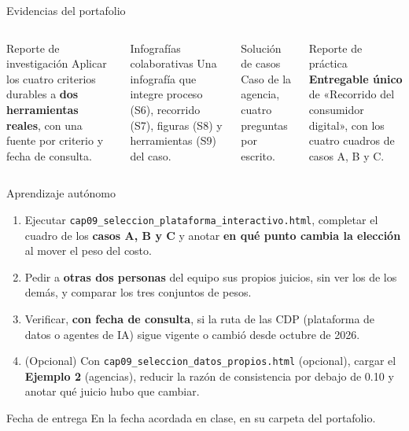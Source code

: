 \documentclass[aspectratio=169,xcolor=dvipsnames]{beamer}
\begin{document}
\begin{frame}{Evidencias del portafolio}
\small
\begin{columns}[T]
  \begin{block}{Reporte de investigación}
    \scriptsize Aplicar los cuatro criterios durables a \textbf{dos herramientas reales}, con una fuente por criterio y fecha de consulta.
  \end{block}
  \begin{block}{Infografías colaborativas}
    \scriptsize Una infografía que integre proceso (S6), recorrido (S7), figuras (S8) y herramientas (S9) del caso.
  \end{block}
  \begin{block}{Solución de casos}
    \scriptsize Caso de la agencia, cuatro preguntas por escrito.
  \end{block}
  \begin{block}{Reporte de práctica}
    \scriptsize \textbf{Entregable único} de «Recorrido del consumidor digital», con los cuatro cuadros de casos A, B y C.
  \end{block}
\end{columns}
\end{frame}

\begin{frame}{Aprendizaje autónomo}
\footnotesize
\begin{enumerate}
  \item Ejecutar \texttt{cap09\_seleccion\_\allowbreak plataforma\_interactivo.html}, completar el cuadro de los \textbf{casos A, B y C} y anotar \textbf{en qué punto cambia la elección} al mover el peso del costo.
  \vspace{1pt}
  \item Pedir a \textbf{otras dos personas} del equipo sus propios juicios, sin ver los de los demás, y comparar los tres conjuntos de pesos.
  \vspace{1pt}
  \item Verificar, \textbf{con fecha de consulta}, si la ruta de las CDP (plataforma de datos o agentes de IA) sigue vigente o cambió desde octubre de 2026.
  \vspace{1pt}
  \item (Opcional) Con \texttt{cap09\_seleccion\_datos\_propios.html} (opcional), cargar el \textbf{Ejemplo 2} (agencias), reducir la razón de consistencia por debajo de 0.10 y anotar qué juicio hubo que cambiar.
\end{enumerate}
\vspace{2pt}
\begin{alertblock}{Fecha de entrega}
  En la fecha acordada en clase, en su carpeta del portafolio.
\end{alertblock}
\end{frame}
\end{document}
